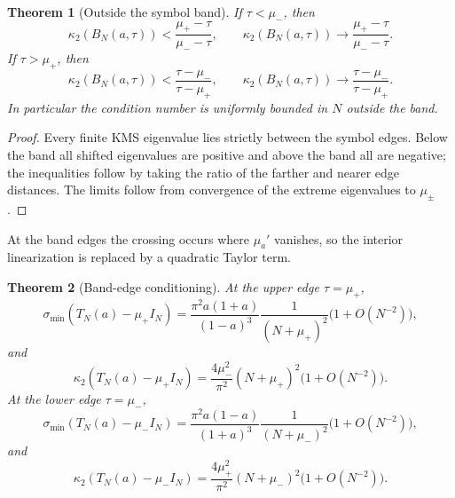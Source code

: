 \documentclass[11pt,reqno]{amsart}
\theoremstyle{plain}
\newtheorem{theorem}{Theorem}
\theoremstyle{definition}
\newcommand{\BN}{B_N}
\newcommand{\TN}{T_N}
\begin{document}
\begin{theorem}[Outside the symbol band]\label{thm:outside}
If $\tau<\mu_-$, then
\begin{equation}\label{eq:outside-lower}
\kappa_2(\BN(a,\tau))
<\frac{\mu_+-\tau}{\mu_--\tau},
\qquad
\kappa_2(\BN(a,\tau))
\longrightarrow
\frac{\mu_+-\tau}{\mu_--\tau}.
\end{equation}
If $\tau>\mu_+$, then
\begin{equation}\label{eq:outside-upper}
\kappa_2(\BN(a,\tau))
<\frac{\tau-\mu_-}{\tau-\mu_+},
\qquad
\kappa_2(\BN(a,\tau))
\longrightarrow
\frac{\tau-\mu_-}{\tau-\mu_+}.
\end{equation}
In particular the condition number is uniformly bounded in $N$ outside the band.
\end{theorem}

\begin{proof}
Every finite KMS eigenvalue lies strictly between the symbol edges.  Below the band
all shifted eigenvalues are positive and above the band all are negative; the
inequalities follow by taking the ratio of the farther and nearer edge distances.
The limits follow from convergence of the extreme eigenvalues to $\mu_\pm$.
\end{proof}

At the band edges the crossing occurs where $\mu_a'$ vanishes, so the interior
linearization is replaced by a quadratic Taylor term.

\begin{theorem}[Band-edge conditioning]\label{thm:edges}
At the upper edge $\tau=\mu_+$,
\begin{equation}\label{eq:edge-up-smin}
\sigma_{\min}(\TN(a)-\mu_+I_N)
=
\frac{\pi^2a(1+a)}{(1-a)^3}
\frac{1}{(N+\mu_+)^2}
\bigl(1+O(N^{-2})\bigr),
\end{equation}
and
\begin{equation}\label{eq:edge-up-kappa}
\boxed{
\kappa_2(\TN(a)-\mu_+I_N)
=
\frac{4\mu_-^2}{\pi^2}(N+\mu_+)^2
\bigl(1+O(N^{-2})\bigr).}
\end{equation}
At the lower edge $\tau=\mu_-$,
\begin{equation}\label{eq:edge-low-smin}
\sigma_{\min}(\TN(a)-\mu_-I_N)
=
\frac{\pi^2a(1-a)}{(1+a)^3}
\frac{1}{(N+\mu_-)^2}
\bigl(1+O(N^{-2})\bigr),
\end{equation}
and
\begin{equation}\label{eq:edge-low-kappa}
\boxed{
\kappa_2(\TN(a)-\mu_-I_N)
=
\frac{4\mu_+^2}{\pi^2}(N+\mu_-)^2
\bigl(1+O(N^{-2})\bigr).}
\end{equation}
\end{theorem}
\end{document}
